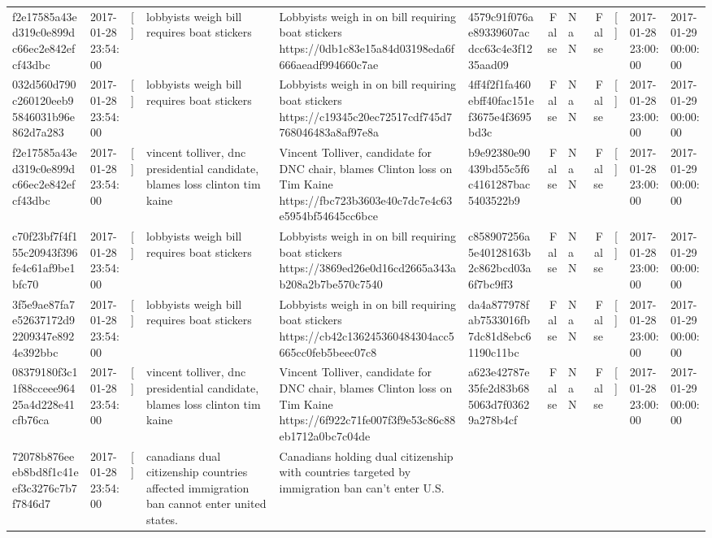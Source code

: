\begin{tabular}{llllllrlrlll}
f2e17585a43ed319c0e899dc66ec2e842efcf43dbc & 2017-01-28 23:54:00 & [] & lobbyists weigh bill requires boat stickers & Lobbyists weigh in on bill requiring boat stickers https://0db1c83e15a84d03198eda6f666aeadf994660c7ae & 4579c91f076ae89339607acdcc63c4e3f1235aad09 & False & NaN & False & [] & 2017-01-28 23:00:00 & 2017-01-29 00:00:00 \\
032d560d790c260120eeb95846031b96e862d7a283 & 2017-01-28 23:54:00 & [] & lobbyists weigh bill requires boat stickers & Lobbyists weigh in on bill requiring boat stickers https://c19345c20ec72517cdf745d7768046483a8af97e8a & 4ff4f2f1fa460ebff40fac151ef3675e4f3695bd3c & False & NaN & False & [] & 2017-01-28 23:00:00 & 2017-01-29 00:00:00 \\
f2e17585a43ed319c0e899dc66ec2e842efcf43dbc & 2017-01-28 23:54:00 & [] & vincent tolliver, dnc presidential candidate, blames loss clinton tim kaine & Vincent Tolliver, candidate for DNC chair, blames Clinton loss on Tim Kaine https://fbc723b3603e40c7dc7e4c63e5954bf54645cc6bce & b9e92380e90439bd55c5f6c4161287bac5403522b9 & False & NaN & False & [] & 2017-01-28 23:00:00 & 2017-01-29 00:00:00 \\
c70f23bf7f4f155c20943f396fe4c61af9be1bfc70 & 2017-01-28 23:54:00 & [] & lobbyists weigh bill requires boat stickers & Lobbyists weigh in on bill requiring boat stickers https://3869ed26e0d16cd2665a343ab208a2b7be570c7540 & c858907256a5e40128163b2c862bcd03a6f7bc9ff3 & False & NaN & False & [] & 2017-01-28 23:00:00 & 2017-01-29 00:00:00 \\
3f5e9ae87fa7e52637172d92209347e8924e392bbc & 2017-01-28 23:54:00 & [] & lobbyists weigh bill requires boat stickers & Lobbyists weigh in on bill requiring boat stickers https://cb42c136245360484304acc5665cc0feb5beec07c8 & da4a877978fab7533016fb7dc81d8ebc61190c11bc & False & NaN & False & [] & 2017-01-28 23:00:00 & 2017-01-29 00:00:00 \\
08379180f3c11f88cceee96425a4d228e41cfb76ca & 2017-01-28 23:54:00 & [] & vincent tolliver, dnc presidential candidate, blames loss clinton tim kaine & Vincent Tolliver, candidate for DNC chair, blames Clinton loss on Tim Kaine https://6f922c71fe007f3f9e53c86c88eb1712a0bc7c04de & a623e42787e35fe2d83b685063d7f03629a278b4cf & False & NaN & False & [] & 2017-01-28 23:00:00 & 2017-01-29 00:00:00 \\
72078b876eeeb8bd8f1c41eef3c3276c7b7f7846d7 & 2017-01-28 23:54:00 & [] & canadians dual citizenship countries affected immigration ban cannot enter united states. & Canadians holding dual citizenship with countries targeted by immigration ban can’t enter U.S.

\end{tabular}
